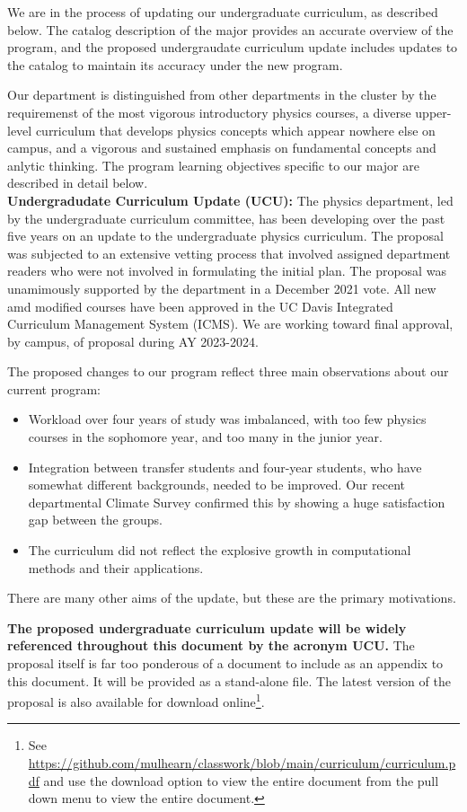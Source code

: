 \documentclass[12pt]{article}
\begin{document}
We are in the process of updating our undergraduate curriculum, as
described below.  The catalog description of the major provides an
accurate overview of the program, and the proposed undergraudate
curriculum update includes updates to the catalog to maintain its
accuracy under the new program.

Our department is distinguished from other departments in the cluster
by the requiremenst of the most vigorous introductory physics courses,
a diverse upper-level curriculum that develops physics concepts which
appear nowhere else on campus, and a vigorous and sustained emphasis
on fundamental concepts and anlytic thinking.  The program learning
objectives specific to our major are described in detail below.\\[3pt]

\noindent
{\bf Undergradudate Curriculum Update (UCU):}
The physics department, led by the undergraduate curriculum committee,
has been developing over the past five years on an update to the
undergraduate physics curriculum.  The proposal was subjected to an
extensive vetting process that involved assigned department readers
who were not involved in formulating the initial plan.  The proposal
was unamimously supported by the department in a December 2021 vote.
All new amd modified courses have been approved in the UC Davis
Integrated Curriculum Management System (ICMS).  We are working toward
final approval, by campus, of proposal during AY 2023-2024.

The proposed changes to our program reflect three main observations about our current program: 
\begin{itemize}
 \item Workload over four years of study was imbalanced, with too few physics
courses in the sophomore year, and too many in the junior year. 
 \item Integration between transfer students and
four-year students, who have somewhat different backgrounds, needed to be
improved. Our recent departmental Climate Survey confirmed this by showing a
huge satisfaction gap between the groups. 
 \item  The curriculum did not reflect the explosive growth
in computational methods and their applications.
\end{itemize}
There are many other aims of the update, but these are the primary motivations.

{\bf The proposed undergraduate curriculum update will be widely
  referenced throughout this document by the acronym UCU.}  The
proposal itself is far too ponderous of a document to include as an
appendix to this document.  It will be provided as a stand-alone file.
The latest version of the proposal is also available for download
online\footnote{See
  \href{https://github.com/mulhearn/classwork/blob/main/curriculum/curriculum.pdf}{https://github.com/mulhearn/classwork/blob/main/curriculum/curriculum.pdf}
  and use the download option to view the entire document from the
  pull down menu to view the entire document.}.\\[3pt]
\end{document}
